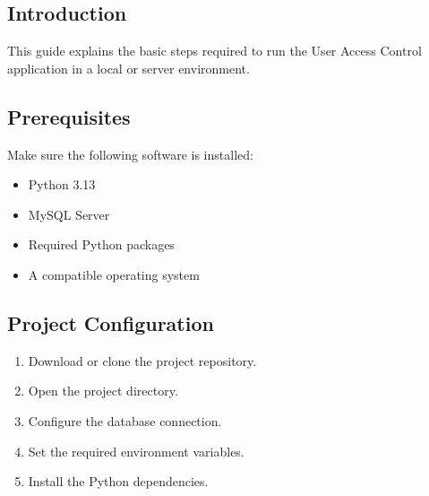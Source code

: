 \documentclass[letterpaper,10pt,english]{sphinxmanual}
\begin{document}
\subsection{Introduction}
\label{\detokenize{deployment:introduction}}
\sphinxAtStartPar
This guide explains the basic steps required to run the User Access Control
application in a local or server environment.


\subsection{Prerequisites}
\label{\detokenize{deployment:prerequisites}}
\sphinxAtStartPar
Make sure the following software is installed:
\begin{itemize}
\item {} 
\sphinxAtStartPar
Python 3.13

\item {} 
\sphinxAtStartPar
MySQL Server

\item {} 
\sphinxAtStartPar
Required Python packages

\item {} 
\sphinxAtStartPar
A compatible operating system

\end{itemize}


\subsection{Project Configuration}
\label{\detokenize{deployment:project-configuration}}\begin{enumerate}
%
\item {} 
\sphinxAtStartPar
Download or clone the project repository.

\item {} 
\sphinxAtStartPar
Open the project directory.

\item {} 
\sphinxAtStartPar
Configure the database connection.

\item {} 
\sphinxAtStartPar
Set the required environment variables.

\item {} 
\sphinxAtStartPar
Install the Python dependencies.

\end{enumerate}
\end{document}
